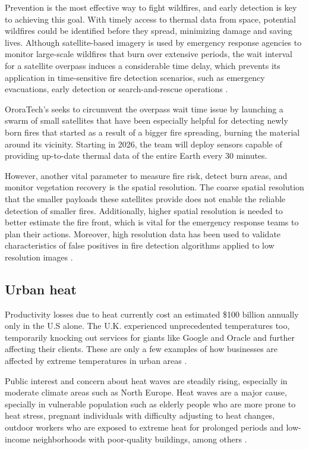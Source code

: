    Prevention is the most effective way to fight wildfires, and early detection is key to achieving this goal. 
    With timely access to thermal data from space, potential wildfires could be identified before they spread, minimizing damage and saving lives.
    Although satellite-based imagery is used by emergency response agencies to monitor large-scale wildfires that burn over extensive periods, the wait interval for a satellite overpass induces a considerable time delay, which prevents its application in time-sensitive fire detection scenarios, such as emergency evacuations, early detection or search-and-rescue operations \cite{lippitt2015time}. 

    OroraTech's seeks to circumvent the overpass wait time issue by launching a swarm of small satellites that have  been especially helpful for detecting newly born fires that started as a result of a bigger fire spreading, burning the material around its vicinity. Starting in 2026,  the team will deploy sensors capable of providing up-to-date thermal data of the entire Earth every 30 minutes.
    
    However, another vital parameter  to measure fire risk, detect burn areas, and monitor vegetation recovery is the spatial resolution. The coarse spatial resolution that the smaller payloads these satellites provide does not enable the reliable detection of smaller fires. Additionally, higher spatial resolution is needed to better estimate the fire front, which is vital for the emergency response teams to plan their actions.
    Moreover, high resolution data has been used to validate characteristics of false positives in fire detection algorithms applied to low resolution images \cite{ijgi11120601}. 

    \subsection{Urban heat}

    Productivity losses due to heat currently cost an estimated \$100 billion annually only in the U.S alone.
    The U.K. experienced unprecedented temperatures too, temporarily knocking out services for giants like Google and Oracle and further affecting their clients.
    These are only a few examples of how businesses are affected by extreme temperatures in urban areas \cite{atlanticcouncil2021extreme}.  

    Public interest and concern about heat waves are steadily rising, especially in moderate climate areas such as North Europe. Heat waves are a major cause, specially in vulnerable population such as elderly people who are more prone to heat stress, pregnant individuals with difficulty adjusting to heat changes, outdoor workers who are exposed to extreme heat for prolonged periods and low-income neighborhoods with poor-quality buildings, among others \cite{Hsu2021Disproportionate}.   

